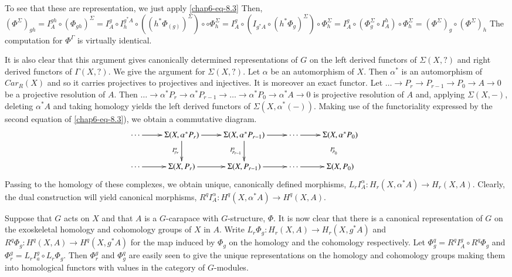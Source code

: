 To see that these are representation, we just apply \ref{chap6-eq-8.3} Then, $(\Phi^{\Sigma})_{{g}h} = I_{A}^{{g} h} \circ (\Phi_{{g} h})^{\Sigma} = I_{A}^{{g}} \circ I_{h}^{{g}^{*} A}
\circ ((h^{*} \Phi_{(g)})^{\Sigma}) \circ \circ \Phi_{h}^{\Sigma} = I_{A}^{{g}} \circ (I_{{g}^{*} A} \circ (h^{*} \Phi_{{g}})^{\Sigma}) \circ \Phi_{h}^{\Sigma} = I_{A}^{{g}} \circ (\Phi_{{g}}^{\Sigma} \circ I_{A}^{h}) \circ \Phi_{h}^{\Sigma} = (\Phi^{\Sigma})_{{g}} \circ (\Phi^{\Sigma})_{h}$ The computation for $\Phi^{\Gamma}$ is virtually identical.

It is also clear that this argument gives canonically determined representations of $G$ on the left derived functors of $\Sigma(X, ?)$ and right derived functors of $\Gamma(X, ?)$. We give the argument for $\Sigma(X, ?)$. Let $\alpha$ be an automorphism of $X$. Then $\alpha^{*}$ is an automorphism of $Car_{R}(X)$ and so it carries projectives to projectives and injectives. It is moreover an exact functor. Let $\ldots \rightarrow P_{r} \rightarrow P_{r-1} \rightarrow P_{0}\rightarrow  A \rightarrow 0$ be a projective resolution of $A$. Then $\ldots  \rightarrow \alpha^{*}P_{r} \rightarrow \alpha^{*}P_{r-1} \rightarrow \ldots \rightarrow \alpha^{*}P_{0} \rightarrow \alpha^{*}A \rightarrow 0$ is projective resolution of $A$ and, applying $\Sigma(X, -)$, deleting $\alpha^{*}A $ and taking homology yields the left derived functors of $\Sigma(X, \alpha^{*}(-))$. Making use of the functoriality expressed by the second equation of \ref{chap6-eq-8.3}), we obtain a commutative diagram.
$$
\xymatrix{
\cdots \ar[r] & \Sigma(X, \alpha^{*}P_{r})\ar[r]\ar[d]_{I_{p_{r}}^{\alpha}} &
\Sigma(X, \alpha^{*}P_{r-1})\ar[r]\ar[d]_{I_{p_{r-1}}^{\alpha}} & \cdots \ar[r]&\Sigma(X, \alpha^{*} P_{0})\ar@{}[d]_{I_{P_{0}}^{\alpha}}&\\
\cdots \ar[r] & \Sigma(X, P_{r})\ar[r] & \Sigma(X, P_{r-1})\ar[r] & \cdots \ar[r] &\Sigma(X, P_{0})&
}
$$
Passing to the homology of these complexes, we obtain unique, canonically defined morphisms, $L_{r}I_{A}^{\alpha}: H_{r}(X, \alpha^{*}A) \rightarrow H_{r}(X, A)$. Clearly, the dual construction will yield canonical morphisms, $R^{q}I_{A}^{\alpha} : H^{q}(X, \alpha^{*}A) \rightarrow H^{q}(X, A)$.

Suppose that $G$ acts on $X$ and that $A$ is a $G$-carapace with $G$-structure, $\Phi$. It is now clear that there is a canonical representation of $G$ on the exoskeletal homology and cohomology groups of $X$ in $A$. Write $L_{r}\Phi_{{g}} : H_{r}(X, A) \rightarrow H_{r}(X, {g}^{*} A)$ and $R^{q}\Phi_{{g}} : H^{q}(X, A)\rightarrow H^{q}(X, {g}^{*} A)$ for the map induced by $\Phi_{{g}}$ on the homology and the cohomology respectively. Let $\Phi_{{g}}^{q} = R^{q}I_{A}^{{g}} \circ R^{q}\Phi_{{g}}$ and $\Phi_{r}^{{g}} = L_{r}I_{a}^{{g}} \circ L_{r}\Phi_{{g}}$. Then $\Phi_{r}^{{g}}$ and $\Phi_{{g}}^{q}$ are easily seen to give the unique representations on the homology and cohomology groups making them into homological functors with values in the category of $G$-modules.

